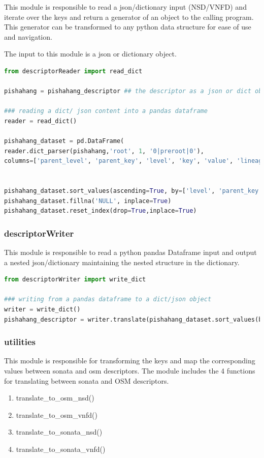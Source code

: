 This module is responsible to read a json/dictionary input (NSD/VNFD) and iterate over the keys and return a generator of an object to the calling program. This generator can be transformed to any python data structure for ease of use and navigation. 

The input to this module is a json or dictionary object.

\begin{lstlisting}[language=Python]
from descriptorReader import read_dict

pishahang = pishahang_descriptor ## the descriptor as a json or dict object

### reading a dict/ json content into a pandas dataframe
reader = read_dict()

pishahang_dataset = pd.DataFrame(
reader.dict_parser(pishahang,'root', 1, '0|preroot|0'), 
columns=['parent_level', 'parent_key', 'level', 'key', 'value', 'lineage'])


pishahang_dataset.sort_values(ascending=True, by=['level', 'parent_key'],inplace=True)
pishahang_dataset.fillna('NULL', inplace=True)
pishahang_dataset.reset_index(drop=True,inplace=True)

\end{lstlisting}
\subsubsection{descriptorWriter}

This module is responsible to read a python pandas Dataframe input and output a nested json/dictionary maintaining the nested structure in the dictionary.

\begin{lstlisting}[language=Python]
from descriptorWriter import write_dict

### writing from a pandas dataframe to a dict/json object
writer = write_dict()
pishahang_descriptor = writer.translate(pishahang_dataset.sort_values(by='lineage'))

\end{lstlisting}

\subsubsection{utilities}

This module is responsible for transforming the keys and map the corresponding values between sonata and osm descriptors. The module includes the 4 functions for translating between sonata and OSM descriptors. 
\begin{enumerate}
	\item translate\_to\_osm\_nsd()
	\item translate\_to\_osm\_vnfd()
	\item translate\_to\_sonata\_nsd()
	\item translate\_to\_sonata\_vnfd()
\end{enumerate}

